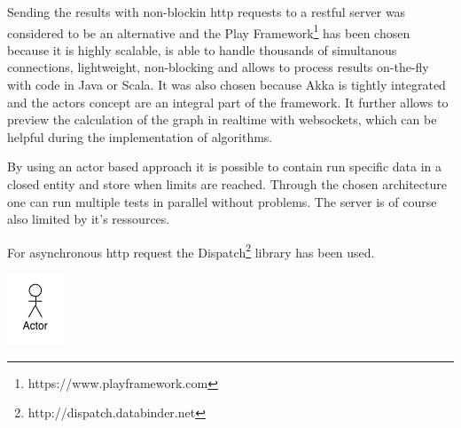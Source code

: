 Sending the results with non-blockin http requests to a restful server was considered to be an alternative and the Play Framework\footnote{https://www.playframework.com} has been chosen because it is highly scalable, is able to handle thousands of simultanous connections, lightweight, non-blocking and allows to process results on-the-fly with code in Java or Scala. It was also chosen because Akka is tightly integrated and the actors concept are an integral part of the framework. It further allows to preview the calculation of the graph in realtime with websockets, which can be helpful during the implementation of algorithms.

By using an actor based approach it is possible to contain run specific data in a closed entity and store when limits are reached. Through the chosen architecture one can run multiple tests in parallel without problems. The server is of course also limited by it's ressources.

For asynchronous http request the Dispatch\footnote{http://dispatch.databinder.net} library has been used.

\includegraphics{graphics/monitoring}


